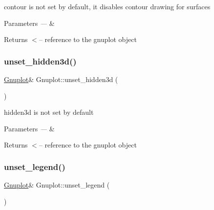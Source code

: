 contour is not set by default, it disables contour drawing for surfaces


\begin{DoxyParams}{Parameters}
{\em ---} & \\
\hline
\end{DoxyParams}
\begin{DoxyReturn}{Returns}
$<$-- reference to the gnuplot object 
\end{DoxyReturn}
\mbox{\label{class_gnuplot_ab8688182047f746090e1e5f2a8c11c9e}} 
\subsubsection{\texorpdfstring{unset\+\_\+hidden3d()}{unset\_hidden3d()}}
{\footnotesize\ttfamily \mbox{\hyperlink{class_gnuplot}{Gnuplot}}\& Gnuplot\+::unset\+\_\+hidden3d (\begin{DoxyParamCaption}{ }\end{DoxyParamCaption})\hspace{0.3cm}{\ttfamily [inline]}}

hidden3d is not set by default


\begin{DoxyParams}{Parameters}
{\em ---} & \\
\hline
\end{DoxyParams}
\begin{DoxyReturn}{Returns}
$<$-- reference to the gnuplot object 
\end{DoxyReturn}
\mbox{\label{class_gnuplot_ace901a18ab1a459213afd3ee0233b5ce}} 
\subsubsection{\texorpdfstring{unset\+\_\+legend()}{unset\_legend()}}
{\footnotesize\ttfamily \mbox{\hyperlink{class_gnuplot}{Gnuplot}}\& Gnuplot\+::unset\+\_\+legend (\begin{DoxyParamCaption}{ }\end{DoxyParamCaption})\hspace{0.3cm}{\ttfamily [inline]}}



